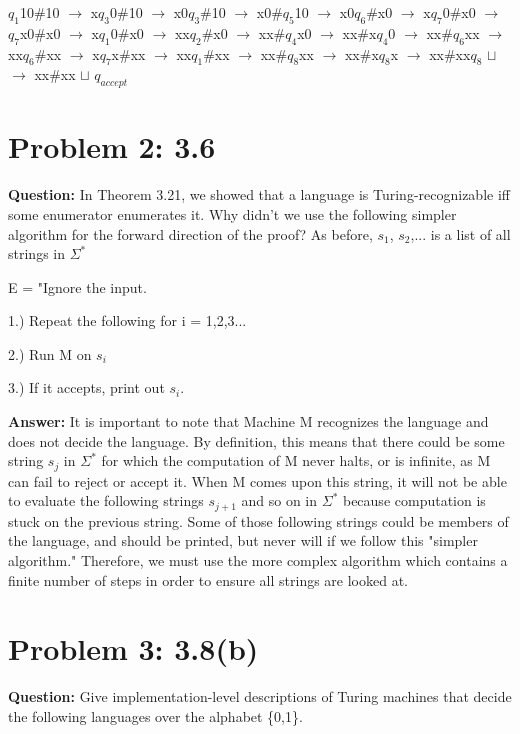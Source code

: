 \documentclass[12pt]{article}
\begin{document}
$q_1$10\#10 $\xrightarrow{}$ x$q_3$0\#10 $\xrightarrow{}$ x0$q_3$\#10 $\xrightarrow{}$
 x0\#$q_5$10 $\xrightarrow{}$  x0$q_6$\#x0 $\xrightarrow{}$  x$q_7$0\#x0 $\xrightarrow{}$  $q_7$x0\#x0 $\xrightarrow{}$  x$q_1$0\#x0 $\xrightarrow{}$ xx$q_2$\#x0 $\xrightarrow{}$ xx\#$q_4$x0 $\xrightarrow{}$ xx\#x$q_4$0 $\xrightarrow{}$
 xx\#$q_6$xx $\xrightarrow{}$  xx$q_6$\#xx $\xrightarrow{}$  x$q_7$x\#xx $\xrightarrow{}$ xx$q_1$\#xx $\xrightarrow{}$ xx\#$q_8$xx $\xrightarrow{}$ xx\#x$q_8$x $\xrightarrow{}$ xx\#xx$q_8$ $\sqcup$ $\xrightarrow{}$ xx\#xx $\sqcup$ $q_{accept}$   
 
 
\section*{Problem 2: 3.6}
{\bfseries Question:} In Theorem 3.21, we showed that a language is Turing-recognizable iff some enumerator enumerates it. Why didn’t we use the following simpler algorithm for the forward direction of the proof? As before, $s_1$, $s_2$,... is a list of all strings in $\Sigma^*$

 E = "Ignore the input. 

1.) Repeat the following for i = 1,2,3...

2.) Run M on $s_i$

3.) If it accepts, print out $s_i$.

{\bfseries Answer:} It is important to note that Machine M recognizes the language and does not decide the language. By definition, this means that there could be some string $s_j$ in $\Sigma^*$ for which the computation of M never halts, or is infinite, as M can fail to reject or accept it. When M comes upon this string, it will not be able to evaluate the following strings $s_{j+1}$ and so on in $\Sigma^*$ because computation is stuck on the previous string. Some of those following strings could be members of the language, and should be printed, but never will if we follow this "simpler algorithm." Therefore, we must use the more complex algorithm which contains a finite number of steps in order to ensure all strings are looked at.

\section*{Problem 3: 3.8(b)}
{\bfseries Question:} Give implementation-level descriptions of Turing machines that decide the following languages over the alphabet \{0,1\}.
\end{document}
